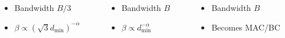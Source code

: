\documentclass[xcolor=dvipsnames,aspectratio=169]{beamer}
\begin{document}
{\begin{figure}
{\begin{tikzpicture} [scale=.5, transform shape,hexa/.style= {shape=regular polygon,regular polygon sides=6,minimum size=1cm, draw,inner sep=0,anchor=south,rotate=30}]
    \end{tikzpicture}
    }
\end{figure}
\vspace{-.2in}
\begin{columns}
 \begin{column}{3.5cm}
    \begin{itemize}
        \item Bandwidth $B/3$ 
        \item $\beta\propto (\sqrt{3}d_{\min})^{-\alpha}$
   \end{itemize}
 \end{column}
 \begin{column}{3.5cm}
    \begin{itemize}
        \item Bandwidth $B$ 
        \item $\beta\propto d_{\min}^{-\alpha}$
   \end{itemize}  
 \end{column}
 \begin{column}{4cm}
    \begin{itemize}
        \item Bandwidth $B$ 
        \item Becomes MAC/BC
   \end{itemize}
  
 \end{column}
\end{columns}
}
\end{document}
